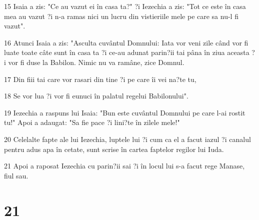 \par 15 Isaia a zis: "Ce au vazut ei în casa ta?" ?i Iezechia a zis: "Tot ce este în casa mea au vazut ?i n-a ramas nici un lucru din vistieriile mele pe care sa nu-l fi vazut".
\par 16 Atunci Isaia a zis: "Asculta cuvântul Domnului: Iata vor veni zile când vor fi luate toate câte sunt în casa ta ?i ce-au adunat parin?ii tai pâna în ziua aceasta ?i vor fi duse la Babilon. Nimic nu va ramâne, zice Domnul.
\par 17 Din fiii tai care vor rasari din tine ?i pe care îi vei na?te tu,
\par 18 Se vor lua ?i vor fi eunuci în palatul regelui Babilonului".
\par 19 Iezechia a raspuns lui Isaia: "Bun este cuvântul Domnului pe care l-ai rostit tu!" Apoi a adaugat: "Sa fie pace ?i lini?te în zilele mele!"
\par 20 Celelalte fapte ale lui Iezechia, luptele lui ?i cum ca el a facut iazul ?i canalul pentru adus apa în cetate, sunt scrise în cartea faptelor regilor lui Iuda.
\par 21 Apoi a raposat Iezechia cu parin?ii sai ?i în locul lui s-a facut rege Manase, fiul sau.

\chapter{21}

